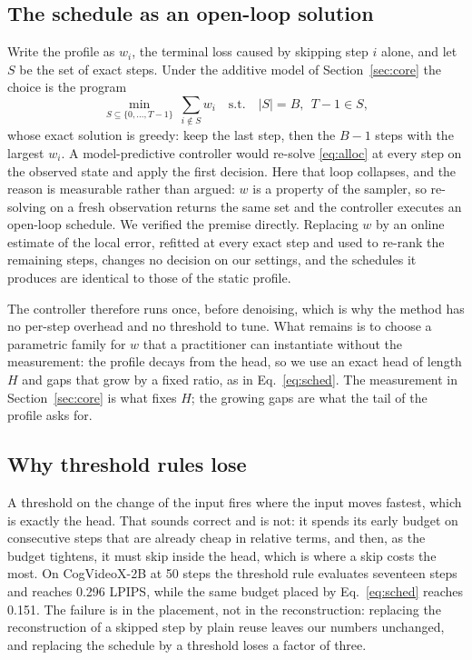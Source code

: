 \subsection{The schedule as an open-loop solution}
\label{sec:openloop}
Write the profile as $w_i$, the terminal loss caused by skipping step $i$ alone, and let $S$ be the set of exact steps. Under the additive model of Section~\ref{sec:core} the choice is the program
\begin{equation}
\min_{S\subseteq\{0,\ldots,T-1\}}\ \sum_{i\notin S} w_i
\quad\text{s.t.}\quad |S|=B,\ \ T-1\in S ,
\label{eq:alloc}
\end{equation}
whose exact solution is greedy: keep the last step, then the $B-1$ steps with the largest $w_i$. A model-predictive controller would re-solve \eqref{eq:alloc} at every step on the observed state and apply the first decision. Here that loop collapses, and the reason is measurable rather than argued: $w$ is a property of the sampler, so re-solving on a fresh observation returns the same set and the controller executes an open-loop schedule. We verified the premise directly. Replacing $w$ by an online estimate of the local error, refitted at every exact step and used to re-rank the remaining steps, changes no decision on our settings, and the schedules it produces are identical to those of the static profile.

The controller therefore runs once, before denoising, which is why the method has no per-step overhead and no threshold to tune. What remains is to choose a parametric family for $w$ that a practitioner can instantiate without the measurement: the profile decays from the head, so we use an exact head of length $H$ and gaps that grow by a fixed ratio, as in Eq.~\ref{eq:sched}. The measurement in Section~\ref{sec:core} is what fixes $H$; the growing gaps are what the tail of the profile asks for.

\subsection{Why threshold rules lose}
\label{sec:price}
A threshold on the change of the input fires where the input moves fastest, which is exactly the head. That sounds correct and is not: it spends its early budget on consecutive steps that are already cheap in relative terms, and then, as the budget tightens, it must skip inside the head, which is where a skip costs the most. On CogVideoX-2B at 50 steps the threshold rule evaluates seventeen steps and reaches 0.296 LPIPS, while the same budget placed by Eq.~\ref{eq:sched} reaches 0.151. The failure is in the placement, not in the reconstruction: replacing the reconstruction of a skipped step by plain reuse leaves our numbers unchanged, and replacing the schedule by a threshold loses a factor of three.

